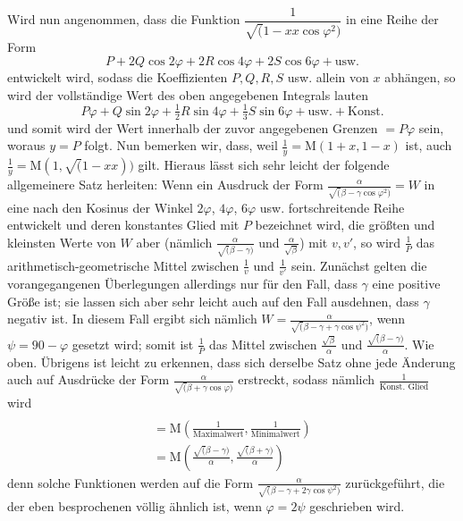 Wird nun angenommen, dass die Funktion \(\dfrac1{\surd(1-xx\cos\varphi^2)}\) in eine Reihe der Form
\[
P+2Q\cos2\varphi+2R\cos4\varphi+2S\cos6\varphi+\text{usw.}
\]
entwickelt wird, sodass die Koeffizienten \(P,Q,R,S\) usw. allein von \(x\) abhängen, so wird der vollständige Wert
des oben angegebenen Integrals lauten
\[
P\varphi+Q\sin2\varphi+\tfrac12R\sin4\varphi+\tfrac13S\sin6\varphi
+\text{usw.}+\text{Konst.}
\]
und somit wird der Wert innerhalb der zuvor angegebenen Grenzen $=P\varphi$ sein, woraus $y=P$ folgt. Nun bemerken wir,
dass, weil $\frac{1}{y}=\mathrm{M}(1+x,1-x)$ ist, auch
$\frac{1}{y}=\mathrm{M}(1,\surd(1-xx))$ gilt. Hieraus lässt sich sehr leicht der folgende
allgemeinere Satz herleiten: Wenn ein Ausdruck der Form
$\frac{\alpha}{\surd(\beta-\gamma\cos\varphi^{2})}=W$
in eine nach den Kosinus der Winkel $2\varphi$, $4\varphi$, $6\varphi$ usw.
fortschreitende Reihe entwickelt und deren konstantes Glied mit $P$ bezeichnet wird, die größten
und kleinsten Werte von $W$ aber (nämlich $\frac{\alpha}{\surd(\beta-\gamma)}$ und
$\frac{\alpha}{\surd\beta}$) mit $v,v'$, so wird $\frac{1}{P}$ das arithmetisch-geometrische Mittel zwischen $\frac{1}{v}$ und $\frac{1}{v'}$ sein. Zunächst gelten
die vorangegangenen Überlegungen allerdings nur für den Fall, dass $\gamma$ eine positive
Größe ist; sie lassen sich aber sehr leicht auch auf den Fall ausdehnen, dass $\gamma$ negativ ist.
In diesem Fall ergibt sich nämlich $W=\frac{\alpha}{\surd(\beta-\gamma+\gamma\cos\psi^{2})}$,
wenn $\psi=90-\varphi$ gesetzt wird; somit ist $\frac{1}{P}$ das Mittel zwischen
$\frac{\surd\beta}{\alpha}$ und $\frac{\surd(\beta-\gamma)}{\alpha}$. Wie oben.
Übrigens ist leicht zu erkennen, dass sich derselbe Satz ohne jede Änderung auch auf Ausdrücke der Form $\frac{\alpha}{\surd(\beta+\gamma\cos\varphi)}$ erstreckt, sodass nämlich
$\frac{1}{\text{Konst. Glied}}$ wird
\[
\begin{gathered}\\=\mathrm{M}\left(\frac{1}{\text{Maximalwert}},\frac{1}{\text{Minimalwert}}\right)\\=\mathrm{M}\left(\frac{\surd(\beta-\gamma)}{\alpha},
                 \frac{\surd(\beta+\gamma)}{\alpha}\right)\end{gathered}
\]
denn solche Funktionen werden auf die Form
$\frac{\alpha}{\surd(\beta-\gamma+2\gamma\cos\psi^{2})}$ zurückgeführt, die der eben besprochenen
völlig ähnlich ist, wenn $\varphi=2\psi$ geschrieben wird.

